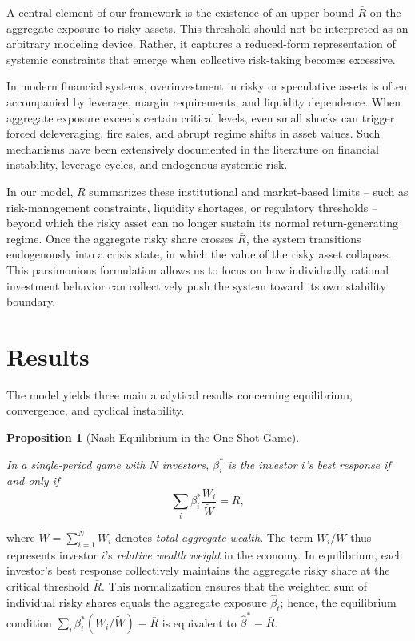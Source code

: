 \documentclass[11pt,a4paper]{article}
\newtheorem{thm}{Proposition}
\begin{document}

A central element of our framework is the existence of an upper bound $\bar R$ on the aggregate exposure to risky assets. This threshold should not be interpreted as an arbitrary modeling device. Rather, it captures a reduced-form representation of systemic constraints that emerge when collective risk-taking becomes excessive.

In modern financial systems, overinvestment in risky or speculative assets is often accompanied by leverage, margin requirements, and liquidity dependence. When aggregate exposure exceeds certain critical levels, even small shocks can trigger forced deleveraging, fire sales, and abrupt regime shifts in asset values. Such mechanisms have been extensively documented in the literature on financial instability, leverage cycles, and endogenous systemic risk.

In our model, $\bar R$ summarizes these institutional and market-based limits -- such as risk-management constraints, liquidity shortages, or regulatory thresholds -- beyond which the risky asset can no longer sustain its normal return-generating regime. Once the aggregate risky share crosses $\bar R$, the system transitions endogenously into a crisis state, in which the value of the risky asset collapses. This parsimonious formulation allows us to focus on how individually rational investment behavior can collectively push the system toward its own stability boundary.



\bigskip
\section{Results}

The model yields three main analytical results concerning equilibrium, convergence, and cyclical instability. 

\begin{framed}
	\begin{thm}[Nash Equilibrium in the One-Shot Game]
		\label{prop:prop1}
	 
	 In a single-period game with $N$ investors, $\beta_{i}^\ast$ is the  investor $i$'s best response if and only if
	 \[
		{ \sum_i \beta_{i}^\ast \frac{W_i}{\widetilde{W}} = \bar{R}},
	 \]
 	\end{thm}
\end{framed}

where $\widetilde W = \sum_{i=1}^N W_i$ denotes \emph{total aggregate wealth}. The term $W_i/\widetilde W$ thus represents investor $i$'s \emph{relative wealth weight} in the economy. In equilibrium, each investor's best response collectively maintains the aggregate risky share at the critical threshold $\bar R$. This normalization ensures that the weighted sum of individual risky shares equals the aggregate exposure $\hat \beta_t$; hence, the equilibrium condition $\sum_i \beta_i^\ast (W_i/\widetilde W)=\bar R$ is equivalent to $\hat\beta^\ast = \bar R$.
\end{document}
